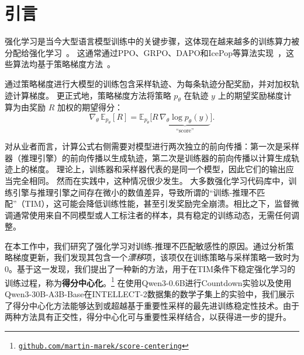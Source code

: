\section{引言}

强化学习是当今大型语言模型训练中的关键步骤，这体现在越来越多的训练算力被分配给强化学习~\citep{o1,deepseek_r1,scaleRL,mai_1}。  
这通常通过PPO、GRPO、DAPO和IcePop等算法实现~\citep{ppo,grpo,dapo,icepop}，这些算法均基于策略梯度方法~\citep{reinforce}。

通过策略梯度进行大模型的训练包含采样轨迹、为每条轨迹分配奖励，并对加权轨迹计算梯度。  
更正式地，策略梯度方法将策略 $p_\theta$  在轨迹 $y$  上的期望奖励梯度计算为由奖励 $R$  加权的期望得分：
\begin{equation}
\nabla_\theta \, \mathbb{E}_{p_\theta}[R] = \mathbb{E}_{p_\theta} \big[ R \, \underbrace{\nabla_\theta \log p_\theta(y)}_{\text{``score''}} \big].
\label{eq:policy_grad}
\end{equation}

对从业者而言，计算公式右侧需要对模型进行两次独立的前向传播：第一次是采样器（推理引擎）的前向传播以生成轨迹，第二次是训练器的前向传播以计算生成轨迹上的梯度。  
理论上，训练器和采样器代表的是同一个模型，因此它们的输出应当完全相同。  
然而在实践中，这种情况很少发生。  
大多数强化学习代码库中，训练引擎与推理引擎之间存在微小的数值差异，导致所谓的“训练-推理不匹配”（TIM），这可能会降低训练性能\citep{scaleRL}，甚至引发奖励完全崩溃\citep{flashrl}。相比之下，监督微调通常使用来自不同模型或人工标注者的样本，具有稳定的训练动态，无需任何调整。

在本工作中，我们研究了强化学习对训练-推理不匹配敏感性的原因。通过分析策略梯度更新，我们发现其包含一个\textit{漂移}项，该项仅在训练策略与采样策略一致时为0。基于这一发现，我们提出了一种新的方法，用于在TIM条件下稳定强化学习的训练过程，称为\textbf{得分中心化}。\footnote{\href{https://github.com/martin-marek/score-centering}{\texttt{github.com/martin-marek/score-centering}}}
在使用Qwen3-0.6B进行Countdown实验以及使用Qwen3-30B-A3B-Base在INTELLECT-2数据集的数学子集上的实验中，我们展示了得分中心化方法能够达到或超越基于重要性采样的最先进训练稳定性技术。由于两种方法具有正交性，得分中心化可与重要性采样结合，以获得进一步的提升。